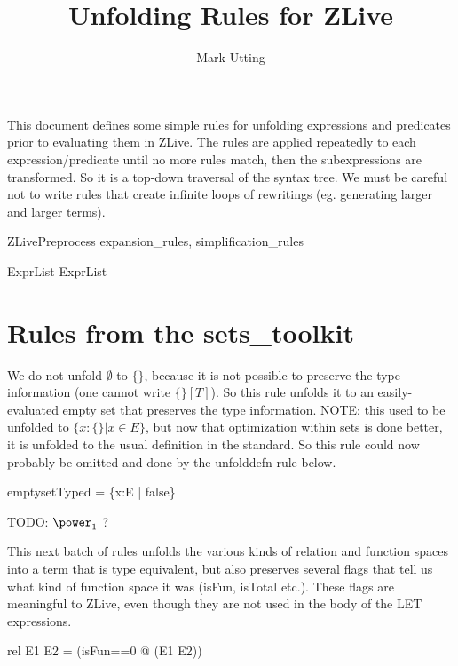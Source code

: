 \documentclass{article}
\title{Unfolding Rules for ZLive}
\author{Mark Utting}
\begin{document}
\maketitle


This document defines some simple rules for unfolding expressions 
and predicates prior to evaluating them in ZLive.  The rules are
applied repeatedly to each expression/predicate until no more rules
match, then the subexpressions are transformed.  So it is a top-down
traversal of the syntax tree.  We must be careful not to write rules
that create infinite loops of rewritings (eg. generating larger and
larger terms).

\begin{zsection}
  \SECTION ZLivePreprocess \parents expansion\_rules, simplification\_rules
\end{zsection}

\begin{zedjoker}{ExprList} ExprList \end{zedjoker}

\section{Rules from the sets\_toolkit}

We do not unfold $\emptyset$ to $\{\}$, because it is not possible
to preserve the type information (one cannot write $\{\}[T]$).
So this rule unfolds it to an easily-evaluated empty set that
preserves the type information.  
NOTE: this used to be unfolded to $\{x:\{\} | x \in E\}$, but
now that optimization within sets is done better, it is unfolded
to the usual definition in the standard.  So this rule could now
probably be omitted and done by the unfolddefn rule below.
\begin{zedrule}{emptysetTyped}
   \emptyset[E] = \{x:E | false\}  
\end{zedrule}

TODO: $\power_1$ ?

This next batch of rules unfolds the various kinds of relation
and function spaces into a term that is type equivalent, but also
preserves several flags that tell us what kind of function space
it was (isFun, isTotal etc.).  These flags are meaningful to ZLive, 
even though they are not used in the body of the LET expressions.

\begin{zedrule}{rel}
   E1 \rel E2 = (\LET isFun==0 @ \power (E1 \cross E2))
\end{zedrule}
\end{document}
